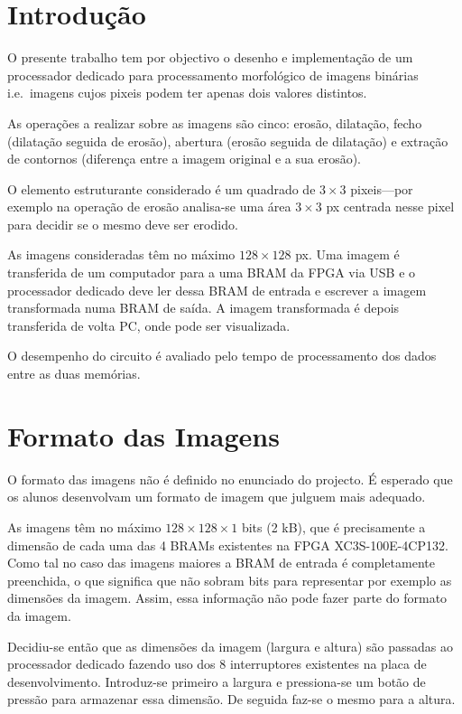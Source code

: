 \documentclass[a4paper]{article}
\begin{document}


\tableofcontents
\pagebreak

\section{Introdução}
O presente trabalho tem por objectivo o desenho e implementação de um processador dedicado para processamento morfológico de imagens binárias i.e.\ imagens cujos pixeis podem ter apenas dois valores distintos.

As operações a realizar sobre as imagens são cinco: erosão, dilatação, fecho (dilatação seguida de erosão), abertura (erosão seguida de dilatação) e extração de contornos (diferença entre a imagem original e a sua erosão).

O elemento estruturante considerado é um quadrado de $3\times3$ pixeis---por exemplo na operação de erosão analisa-se uma área $3\times3$ px centrada nesse pixel para decidir se o mesmo deve ser erodido.

As imagens consideradas têm no máximo $128\times128$ px. Uma imagem é transferida de um computador para a uma BRAM da FPGA via USB e o processador dedicado deve ler dessa BRAM de entrada e escrever a imagem transformada numa BRAM de saída. A imagem transformada é depois transferida de volta PC, onde pode ser visualizada.

O desempenho do circuito é avaliado pelo tempo de processamento dos dados entre as duas memórias.

\section{Formato das Imagens}
\label{sec:formato_imagens}
O formato das imagens não é definido no enunciado do projecto. É esperado que os alunos desenvolvam um formato de imagem que julguem mais adequado.

As imagens têm no máximo $128\times128\times1$ bits (2 kB), que é precisamente a dimensão de cada uma das 4 BRAMs existentes na FPGA XC3S-100E-4CP132. Como tal no caso das imagens maiores a BRAM de entrada é completamente preenchida, o que significa que não sobram bits para representar por exemplo as dimensões da imagem. Assim, essa informação não pode fazer parte do formato da imagem.

Decidiu-se então que as dimensões da imagem (largura e altura) são passadas ao processador dedicado fazendo uso dos 8 interruptores existentes na placa de desenvolvimento. Introduz-se primeiro a largura e pressiona-se um botão de pressão para armazenar essa dimensão. De seguida faz-se o mesmo para a altura.
\end{document}
